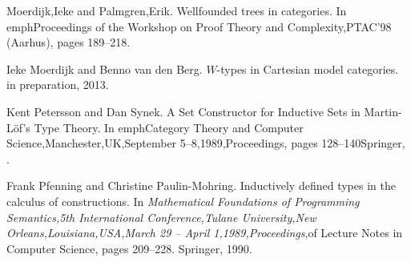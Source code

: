 \documentclass[12pt]{article}
\begin{document}
\begin{thebibliography}{99}
 {Moerdijk,Ieke and Palmgren,Erik}. {Wellfounded trees in categories}. In emph{Proceedings of the {W}orkshop on {P}roof {T}heory and {C}omplexity,{PTAC}'98 ({A}arhus)}, pages {189--218}.

 {Ieke Moerdijk and Benno van den Berg}. {{$W$}-types in Cartesian model categories}. {in preparation}, 2013.

 {Kent Petersson and Dan Synek}. {A Set Constructor for Inductive Sets in {M}artin-{L{\"o}f}'s Type Theory}. In emph{Category Theory and Computer Science,Manchester,UK,September 5--8,1989,Proceedings}, pages {128--140}{Springer}, .

 {Frank Pfenning and Christine Paulin-Mohring}. {Inductively defined types in the calculus of constructions}. In \emph{Mathematical Foundations of Programming Semantics,5th International Conference,Tulane University,New Orleans,Louisiana,USA,March 29 -- April 1,1989,Proceedings},of {Lecture Notes in Computer Science}, pages {209--228}. {Springer}, {1990}.

\end{thebibliography}
\end{document}
